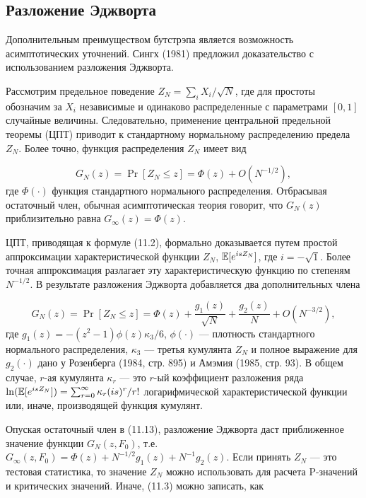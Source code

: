 \subsection{Разложение Эджворта}

Дополнительным преимуществом бутстрэпа является возможность асимптотических уточнений. Сингх (1981) предложил доказательство с использованием разложения Эджворта.

Рассмотрим предельное поведение $Z_N=\sum_{i}X_i/\sqrt{N}$, где для простоты обозначим за $X_i$ независимые и одинаково распределенные с параметрами $[0, 1]$ случайные величины. Следовательно, применение центральной предельной теоремы (ЦПТ) приводит к  стандартному нормальному распределению предела $Z_N$. Более точно,  функция распределения $Z_N$ имеет вид

\begin{equation}
G_N(z)=\Pr[Z_N \leq z] = \Phi(z) + O(N^{-1/2}),
\end{equation} 
где $\Phi(\cdot)$ функция стандартного нормального распределения. Отбрасывая остаточный член, обычная асимптотическая теория говорит, что $G_N(z)$ приблизительно равна $G_{\infty}(z)=\Phi(z)$.

ЦПТ, приводящая к формуле  (11.2), формально доказывается путем простой аппроксимации характеристической функции $Z_N$, $\mathbb{E}[e^{isZ_N}]$, где $i=-\sqrt{1}$. Более точная аппроксимация разлагает эту характеристическую функцию по степеням $N^{-1/2}$. В результате разложения Эджворта добавляется два дополнительных члена

\begin{equation}
G_N(z)=\Pr[Z_N \leq z]=\Phi(z)+\dfrac{g_1(z)}{\sqrt{N}}+\dfrac{g_2(z)}{N}+O(N^{-3/2}),
\end{equation}
где $g_1(z) = -(z^2-1)\phi(z) \kappa_3/6$, $\phi(\cdot)$ --- плотность стандартного нормального распределения, $\kappa_3$ --- третья кумулянта $Z_N$ и полное выражение для $g_2(\cdot)$ дано у Розенберга (1984, стр. 895) и Амэмия (1985, стр. 93). В общем случае, $r$-ая кумулянта $\kappa_r$ --- это $r$-ый коэффициент разложения ряда $\ln(\mathbb{E}[e^{isZ_N}])=\sum_{r=0}^{\infty} \kappa_r(is)^r/r!$ логарифмической характеристической  функции или, иначе, производящей функция кумулянт.

Опуская остаточный член в (11.13), разложение Эджворта даст приближенное значение функции $G_N(z,F_0)$, т.е. $G_{\infty}(z,F_0)=\Phi(z)+N^{-1/2}g_1(z)+N^{-1}g_2(z)$. Если принять $Z_N$ --- это тестовая статистика, то значение $Z_N$ можно использовать для расчета P-значений и критических значений. Иначе, (11.3) можно записать, как

